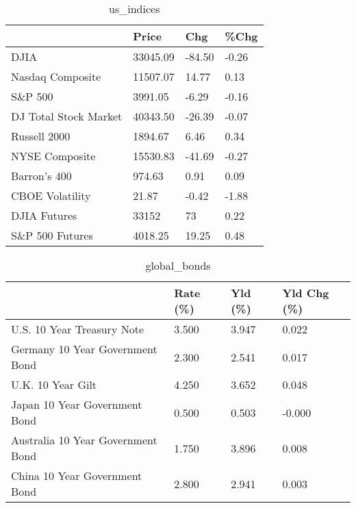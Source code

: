 \documentclass{article}%
\begin{document}
%


\begin{table}[htbp]%
\caption{us\_indices}%
\centering%
\begin{adjustbox}{width=1\textwidth}%
\begin{tabular}{llll}
\toprule
                      &    Price &    Chg &  \%Chg \\
\midrule
                 DJIA & 33045.09 & -84.50 & -0.26 \\
     Nasdaq Composite & 11507.07 &  14.77 &  0.13 \\
              S\&P 500 &  3991.05 &  -6.29 & -0.16 \\
DJ Total Stock Market & 40343.50 & -26.39 & -0.07 \\
         Russell 2000 &  1894.67 &   6.46 &  0.34 \\
       NYSE Composite & 15530.83 & -41.69 & -0.27 \\
         Barron's 400 &   974.63 &   0.91 &  0.09 \\
      CBOE Volatility &    21.87 &  -0.42 & -1.88 \\
         DJIA Futures &    33152 &     73 &  0.22 \\
      S\&P 500 Futures &  4018.25 &  19.25 &  0.48 \\
\bottomrule
\end{tabular}
%
\end{adjustbox}%
\end{table}

%


\begin{table}[htbp]%
\caption{global\_bonds}%
\centering%
\begin{adjustbox}{width=1\textwidth}%
\begin{tabular}{llll}
\toprule
                                  & Rate (\%) & Yld (\%) & Yld Chg (\%) \\
\midrule
       U.S. 10 Year Treasury Note &    3.500 &   3.947 &       0.022 \\
  Germany 10 Year Government Bond &    2.300 &   2.541 &       0.017 \\
                U.K. 10 Year Gilt &    4.250 &   3.652 &       0.048 \\
    Japan 10 Year Government Bond &    0.500 &   0.503 &      -0.000 \\
Australia 10 Year Government Bond &    1.750 &   3.896 &       0.008 \\
    China 10 Year Government Bond &    2.800 &   2.941 &       0.003 \\
\bottomrule
\end{tabular}
%
\end{adjustbox}%
\end{table}
\end{document}
